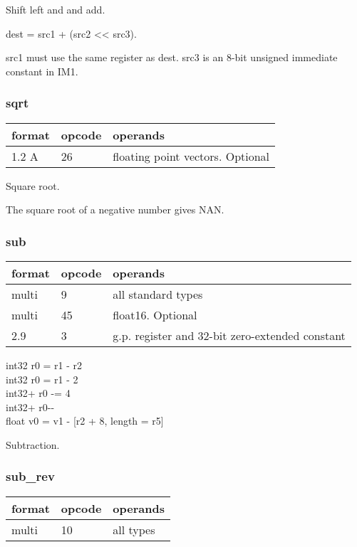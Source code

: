 \documentclass[forwardcom.tex]{subfiles}
\begin{document}
Shift left and and add. 
\vspace{2mm}

dest = src1 + (src2 \textless\textless{}  src3).
\vspace{2mm}

src1 must use the same register as dest. src3 is an 8-bit unsigned immediate constant in IM1.
\vspace{2mm}

\subsubsection{sqrt}
\label{table:sqrtInstruction}
\begin{tabular}{|p{12mm}|p{12mm}|p{110mm}|}
\hline
\bfseries format & \bfseries opcode & \bfseries operands \\ \hline
1.2 A & 26 & floating point vectors. Optional \\ \hline
\end{tabular}
\vspace{2mm}

Square root.
\vspace{2mm}

The square root of a negative number gives NAN.

\subsubsection{sub}
\label{table:subInstruction}
\begin{tabular}{|p{12mm}|p{12mm}|p{110mm}|}
\hline
\bfseries format & \bfseries opcode & \bfseries operands \\ \hline
multi &  9 & all standard types \\ \hline
multi & 45 & float16. Optional \\ \hline
2.9   &  3 & g.p. register and 32-bit zero-extended constant \\ \hline
\end{tabular}
\vspace{2mm}

int32 r0 = r1 - r2 \\
int32 r0 = r1 - 2 \\
int32+ r0 -= 4 \\
int32+ r0-{-} \\
float v0 = v1 - [r2 + 8, length = r5]
\vspace{2mm}

Subtraction.

\subsubsection{sub\_rev}
\label{table:subRevInstruction}
\begin{tabular}{|p{12mm}|p{12mm}|p{110mm}|}
\hline
\bfseries format & \bfseries opcode & \bfseries operands \\ \hline
multi & 10 & all types \\ \hline
\end{tabular}
\vspace{2mm}
\end{document}
